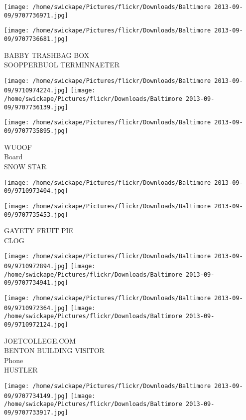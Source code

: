 \documentclass[10pt,letterpaper]{article}
\begin{document}
\texttt{[image: /home/swickape/Pictures/flickr/Downloads/Baltimore 2013-09-09/9707736971.jpg]}

\vspace{0.25in}
\texttt{[image: /home/swickape/Pictures/flickr/Downloads/Baltimore 2013-09-09/9707736681.jpg]}

BABBY TRASHBAG BOX\\
SOOPPERBUOL TERMINNAETER\\
\pagebreak

\texttt{[image: /home/swickape/Pictures/flickr/Downloads/Baltimore 2013-09-09/9710974224.jpg]}
\texttt{[image: /home/swickape/Pictures/flickr/Downloads/Baltimore 2013-09-09/9707736139.jpg]}

\vspace{0.25in}
\texttt{[image: /home/swickape/Pictures/flickr/Downloads/Baltimore 2013-09-09/9707735895.jpg]}

WUOOF\\
Board\\
SNOW STAR\\
\pagebreak

\texttt{[image: /home/swickape/Pictures/flickr/Downloads/Baltimore 2013-09-09/9710973404.jpg]}

\vspace{0.25in}
\texttt{[image: /home/swickape/Pictures/flickr/Downloads/Baltimore 2013-09-09/9707735453.jpg]}

GAYETY FRUIT PIE\\
CLOG\\
\pagebreak

\texttt{[image: /home/swickape/Pictures/flickr/Downloads/Baltimore 2013-09-09/9710972894.jpg]}
\texttt{[image: /home/swickape/Pictures/flickr/Downloads/Baltimore 2013-09-09/9707734941.jpg]}

\texttt{[image: /home/swickape/Pictures/flickr/Downloads/Baltimore 2013-09-09/9710972364.jpg]}
\texttt{[image: /home/swickape/Pictures/flickr/Downloads/Baltimore 2013-09-09/9710972124.jpg]}

JOETCOLLEGE.COM\\
BENTON BUILDING VISITOR\\
Phone\\
HUSTLER\\
\pagebreak

\texttt{[image: /home/swickape/Pictures/flickr/Downloads/Baltimore 2013-09-09/9707734149.jpg]}
\texttt{[image: /home/swickape/Pictures/flickr/Downloads/Baltimore 2013-09-09/9707733917.jpg]}
\end{document}
